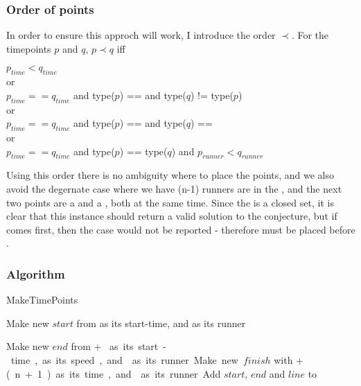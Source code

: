 \subsubsection{Order of points}
In order to ensure this approch will work, I introduce the order $\prec$. For the timepoints $p$ and $q$, $p \prec q$ iff \\

\begin{center}
$p_{time} < q_{time}$\\
or \\
$p_{time} == q_{time}$ and type($p$) == \comFin and type($q$) != type($p$)\\
or \\
$p_{time} == q_{time}$ and type($p$) == \comStart and type($q$) == \comEnd \\
or \\
$p_{time} == q_{time}$ and type($p$) == type($q$) and $p_{runner} < q_{runner}$
\end{center}

Using this order there is no ambiguity where to place the points, and we also avoid the degernate case where we have (n-1) runners are in the \zone, and the next two points are a \comEnd and a \comStart, both at the same time. Since the \zone is a closed set, it is clear that this instance should return a valid solution to the conjecture, but if \comEnd comes first, then the case would not be reported - therefore \comStart must be placed before \comEnd.

\subsubsection{Algorithm}
\begin{algorithm}[H]
\caption{MakeTimePoints}
\highlights
{}
 
Make new \startT $start$ from \start as its start-time, and \run as its runner 
  
Make new \eT $end$ from \start + \unit * \n as its start-time, \unit as its speed, and \run as its runner
  
Make new \finish $finish$ with \start + \unit * (n+1) as its time, and \run as its runner
  
Add $start$, $end$ and $line$ to \li

\return \li
\end{algorithm}

